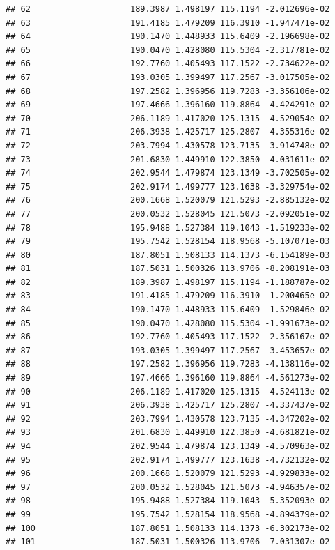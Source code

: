 \documentclass[
]{article}
\begin{document}
\begin{verbatim}
## 62                    189.3987 1.498197 115.1194 -2.012696e-02
## 63                    191.4185 1.479209 116.3910 -1.947471e-02
## 64                    190.1470 1.448933 115.6409 -2.196698e-02
## 65                    190.0470 1.428080 115.5304 -2.317781e-02
## 66                    192.7760 1.405493 117.1522 -2.734622e-02
## 67                    193.0305 1.399497 117.2567 -3.017505e-02
## 68                    197.2582 1.396956 119.7283 -3.356106e-02
## 69                    197.4666 1.396160 119.8864 -4.424291e-02
## 70                    206.1189 1.417020 125.1315 -4.529054e-02
## 71                    206.3938 1.425717 125.2807 -4.355316e-02
## 72                    203.7994 1.430578 123.7135 -3.914748e-02
## 73                    201.6830 1.449910 122.3850 -4.031611e-02
## 74                    202.9544 1.479874 123.1349 -3.702505e-02
## 75                    202.9174 1.499777 123.1638 -3.329754e-02
## 76                    200.1668 1.520079 121.5293 -2.885132e-02
## 77                    200.0532 1.528045 121.5073 -2.092051e-02
## 78                    195.9488 1.527384 119.1043 -1.519233e-02
## 79                    195.7542 1.528154 118.9568 -5.107071e-03
## 80                    187.8051 1.508133 114.1373 -6.154189e-03
## 81                    187.5031 1.500326 113.9706 -8.208191e-03
## 82                    189.3987 1.498197 115.1194 -1.188787e-02
## 83                    191.4185 1.479209 116.3910 -1.200465e-02
## 84                    190.1470 1.448933 115.6409 -1.529846e-02
## 85                    190.0470 1.428080 115.5304 -1.991673e-02
## 86                    192.7760 1.405493 117.1522 -2.356167e-02
## 87                    193.0305 1.399497 117.2567 -3.453657e-02
## 88                    197.2582 1.396956 119.7283 -4.138116e-02
## 89                    197.4666 1.396160 119.8864 -4.561273e-02
## 90                    206.1189 1.417020 125.1315 -4.524113e-02
## 91                    206.3938 1.425717 125.2807 -4.337437e-02
## 92                    203.7994 1.430578 123.7135 -4.347202e-02
## 93                    201.6830 1.449910 122.3850 -4.681821e-02
## 94                    202.9544 1.479874 123.1349 -4.570963e-02
## 95                    202.9174 1.499777 123.1638 -4.732132e-02
## 96                    200.1668 1.520079 121.5293 -4.929833e-02
## 97                    200.0532 1.528045 121.5073 -4.946357e-02
## 98                    195.9488 1.527384 119.1043 -5.352093e-02
## 99                    195.7542 1.528154 118.9568 -4.894379e-02
## 100                   187.8051 1.508133 114.1373 -6.302173e-02
## 101                   187.5031 1.500326 113.9706 -7.031307e-02

\end{verbatim}
\end{document}
